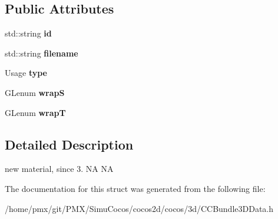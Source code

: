 \subsection*{Public Attributes}
\begin{DoxyCompactItemize}
\item 
\mbox{\label{structNTextureData_a02a6fe13d36b51cfa0202ac6cb2be500}} 
std\+::string {\bfseries id}
\item 
\mbox{\label{structNTextureData_a0db0a25e276c7447cc725288b58fbc94}} 
std\+::string {\bfseries filename}
\item 
\mbox{\label{structNTextureData_a9ee38289d21576c6a48883b505c42591}} 
Usage {\bfseries type}
\item 
\mbox{\label{structNTextureData_a7a825dc6b0a4270c118ad83ac18f0830}} 
G\+Lenum {\bfseries wrapS}
\item 
\mbox{\label{structNTextureData_a53f3a7ccf2801a674bd7a91d7ba61852}} 
G\+Lenum {\bfseries wrapT}
\end{DoxyCompactItemize}


\subsection{Detailed Description}
new material, since 3.  NA  NA 

The documentation for this struct was generated from the following file\+:\begin{DoxyCompactItemize}
\item 
/home/pmx/git/\+P\+M\+X/\+Simu\+Cocos/cocos2d/cocos/3d/C\+C\+Bundle3\+D\+Data.\+h\end{DoxyCompactItemize}
